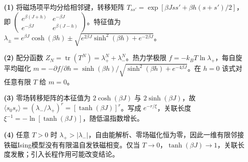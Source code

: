 \par\noindent\textbf{(1)} 将磁场项平均分给相邻键，转移矩阵 \(T_{ss'}=\exp[\beta Jss'+\beta h(s+s')/2]\)，即 \(\begin{pmatrix}e^{\beta(J+h)}&e^{-\beta J}\\e^{-\beta J}&e^{\beta(J-h)}\end{pmatrix}\)。特征值为 \(\lambda_\pm=e^{\beta J}\cosh(\beta h)\pm\sqrt{e^{2\beta J}\sinh^2(\beta h)+e^{-2\beta J}}\)。
\par\noindent\textbf{(2)} 配分函数 \(Z_N=\operatorname{tr}(T^N)=\lambda_+^N+\lambda_-^N\)。热力学极限 \(f=-k_BT\ln\lambda_+\)，每自旋平均磁化 \(m=-\partial f/\partial h=\sinh(\beta h)/\sqrt{\sinh^2(\beta h)+e^{-4\beta J}}\)。在 \(h=0\) 该式对任意有限 \(T\) 给 \(m=0\)。
\par\noindent\textbf{(3)} 零场转移矩阵的本征值为 \(2\cosh(\beta J)\) 与 \(2\sinh(\beta J)\)，故 \(\langle s_0s_r\rangle=(\lambda_-/\lambda_+)^r=[\tanh(\beta J)]^r\)。写成 \(e^{-r/\xi}\)，关联长度 \(\xi^{-1}=-\ln[\tanh(\beta J)]\)，随低温指数增长。
\par\noindent\textbf{(4)} 任意 \(T>0\) 时 \(\lambda_+>|\lambda_-|\)，自由能解析、零场磁化恒为零，因此一维有限邻接铁磁Ising模型没有有限温自发铁磁相变。仅当 \(T\to0\)，\(\tanh(\beta J)\to1\)，关联长度发散；引入长程作用可能改变结论。

